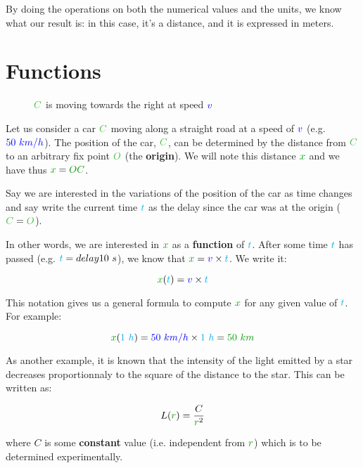 By doing the operations on both the numerical values and the units,
we know what our result is: in this case, it's a distance, and it is
expressed in meters.



\section{Functions}

\begin{figure}[H]
\centering
{}
\caption{$\posit{C}$ is moving towards the right at speed $\textcolor{blue}{v}$}
\end{figure}

Let us consider a car $\posit{C}$ moving along a straight road at a
speed of $\textcolor{blue}{v}$ (e.g. $\textcolor{blue}{50~km/h}$). The position of the car,
$\posit{C}$, can be determined by the distance from $\posit{C}$ to an
arbitrary fix point $\posit{O}$ (the \textbf{origin}). We will note this
distance $\dist{x}$ and we have thus $\dist{x} = \dist{OC}$.

Say we are interested in the variations of the position of the car as
time changes and say write the current time $\textcolor{cyan}{t}$ as the delay since
the car was at the origin ($\posit{C} = \posit{O}$).

In other words, we are interested in $\dist{x}$ as a \textbf{function}
of $\textcolor{cyan}{t}$. After some time $\textcolor{cyan}{t}$ has passed (e.g. $\textcolor{cyan}{t}
= delay{10~s}$), we know that $\dist{x} = \speed{v} \times \delay{t}$. We
write it:

\[
\dist{x}(\delay{t}) = \speed{v} \times \delay{t}
\]

This notation gives us a general formula to compute $\dist{x}$ for any
given value of $\textcolor{cyan}{t}$. For example:

\[
\dist{x}(\delay{1~h})
= \speed{50~km/h} \times \delay{1~h}
= \dist{50~km}
\]

As another example, it is known that the intensity of the light emitted by a star decreases proportionnaly to the square of the distance to the star. This can be written as:

\[
L(\dist{r}) = \frac C {\dist{r}^2}
\]

where $C$ is some \textbf{constant} value (i.e. independent from
$\dist{r}$) which is to be determined experimentally.



